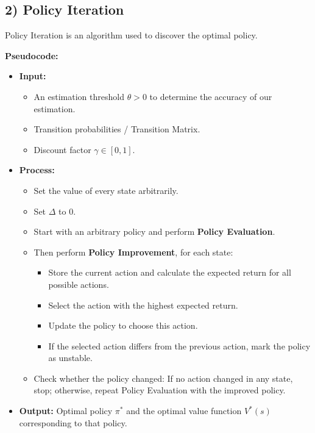 \documentclass[12pt]{article}
\begin{document}
\subsection*{2) Policy Iteration}
Policy Iteration is an algorithm used to discover the optimal policy.

\newpage
\noindent\textbf{Pseudocode:}
\begin{itemize}[label=$\bullet$]
    \item \textbf{Input:}
    \begin{itemize}[label=$\circ$]
        \item An estimation threshold $\theta > 0$ to determine the accuracy of our estimation.
        \item Transition probabilities / Transition Matrix.
        \item Discount factor $\gamma \in [0,1]$.
    \end{itemize}
    \item \textbf{Process:}
    \begin{itemize}[label=$\circ$]
        \item Set the value of every state arbitrarily.
        \item Set $\Delta$ to 0.
        \item Start with an arbitrary policy and perform \textbf{Policy Evaluation}.
        \item Then perform \textbf{Policy Improvement}, for each state:
        \begin{itemize}[label=--]
            \item Store the current action and calculate the expected return for all possible actions.
            \item Select the action with the highest expected return.
            \item Update the policy to choose this action.
            \item If the selected action differs from the previous action, mark the policy as unstable.
        \end{itemize}
        \item Check whether the policy changed: If no action changed in any state, stop; otherwise, repeat Policy Evaluation with the improved policy.
    \end{itemize}
    \item \textbf{Output:} Optimal policy $\pi^*$ and the optimal value function $V^*(s)$ corresponding to that policy.
\end{itemize}
\end{document}
